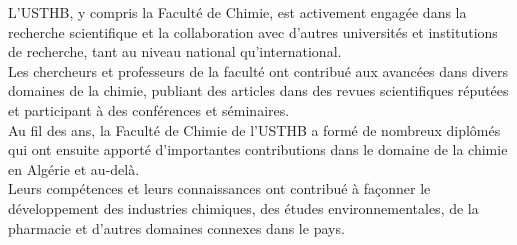 L'USTHB, y compris la Faculté de Chimie, est activement engagée dans la recherche scientifique et la collaboration avec d'autres universités et institutions de recherche,
tant au niveau national qu'international.\\
Les chercheurs et professeurs de la faculté ont contribué aux avancées dans divers domaines de la chimie, 
publiant des articles dans des revues scientifiques réputées et participant à des conférences et séminaires.\\

Au fil des ans, la Faculté de Chimie de l'USTHB a formé de nombreux diplômés qui ont ensuite apporté d'importantes contributions dans le domaine de la chimie en Algérie et au-delà.\\
 Leurs compétences et leurs connaissances ont contribué à façonner le développement des industries chimiques, 
 des études environnementales, de la pharmacie et d'autres domaines connexes dans le pays.\\
\newpage
